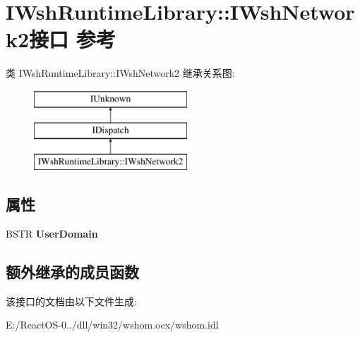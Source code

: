 \hypertarget{interface_i_wsh_runtime_library_1_1_i_wsh_network2}{}\section{I\+Wsh\+Runtime\+Library\+:\+:I\+Wsh\+Network2接口 参考}
\label{interface_i_wsh_runtime_library_1_1_i_wsh_network2}
类 I\+Wsh\+Runtime\+Library\+:\+:I\+Wsh\+Network2 继承关系图\+:\begin{figure}[H]
\begin{center}
\leavevmode
\includegraphics[height=3.000000cm]{interface_i_wsh_runtime_library_1_1_i_wsh_network2}
\end{center}
\end{figure}
\subsection*{属性}
\begin{DoxyCompactItemize}
\item 
\mbox{\label{interface_i_wsh_runtime_library_1_1_i_wsh_network2_a4594c996a5853af1265a0e6fb3397c91}} 
B\+S\+TR {\bfseries User\+Domain}
\end{DoxyCompactItemize}
\subsection*{额外继承的成员函数}


该接口的文档由以下文件生成\+:\begin{DoxyCompactItemize}
\item 
E\+:/\+React\+O\+S-\/0../dll/win32/wshom.\+ocx/wshom.\+idl\end{DoxyCompactItemize}
